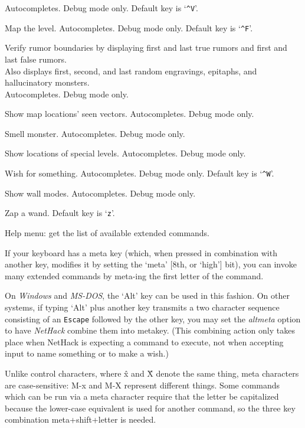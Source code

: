 Autocompletes.
Debug mode only.
Default key is `{\tt \^{}V}'.
\item[\tb{\#wizmap}]
Map the level.
Autocompletes.
Debug mode only.
Default key is `{\tt \^{}F}'.
\item[\tb{\#wizrumorcheck}]
Verify rumor boundaries by displaying first and last true rumors and
first and last false rumors.\\
Also displays first, second, and last random engravings, epitaphs,
and hallucinatory monsters.\\
Autocompletes.
Debug mode only.
\item[\tb{\#wizseenv}]
Show map locations' seen vectors.
Autocompletes.
Debug mode only.
\item[\tb{\#wizsmell}]
Smell monster.
Autocompletes.
Debug mode only.
\item[\tb{\#wizwhere}]
Show locations of special levels.
Autocompletes.
Debug mode only.
\item[\tb{\#wizwish}]
Wish for something.
Autocompletes.
Debug mode only.
Default key is `{\tt \^{}W}'.
\item[\tb{\#wmode}]
Show wall modes.
Autocompletes.
Debug mode only.
\item[\tb{\#zap}]
Zap a wand. Default key is `{\tt z}'.
\item[\tb{\#?}]
Help menu:  get the list of available extended commands.
\elist

\nd If your keyboard has a meta key (which, when pressed in combination
with another key, modifies it by setting the `meta' [8th, or `high']
bit), you can invoke many extended commands by meta-ing the first
letter of the command.

On {\it Windows\/} and {\it MS-DOS\/},
the `Alt' key can be used in this fashion.
On other systems, if typing `Alt' plus another key transmits a
two character sequence consisting of an {\tt Escape}
followed by the other key, you may set the {\it altmeta\/}
option to have {\it NetHack\/} combine them into meta\+key.
(This combining action only takes place when NetHack is expecting a
command to execute, not when accepting input to name something or to
make a wish.)

Unlike control characters, where \^x and \^X denote the same thing,
meta characters are case-sensitive:  M-x and M-X represent different things.
Some commands which can be run via a meta character require that the
letter be capitalized because the lower-case equivalent is used for
another command, so the three key combination meta+shift+letter is needed.

